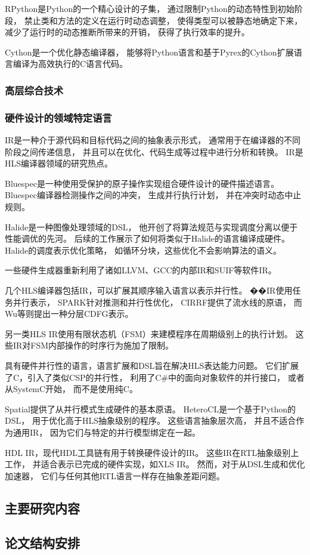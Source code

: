 RPython\cite{rpython}是Python的一个精心设计的子集，
通过限制Python的动态特性到初始阶段，
禁止类和方法的定义在运行时动态调整，
使得类型可以被静态地确定下来，
减少了运行时的动态推断所带来的开销，
获得了执行效率的提升。

Cython\cite{cython}是一个优化静态编译器，
能够将Python语言和基于Pyrex的Cython扩展语言编译为高效执行的C语言代码。


\subsubsection{高层综合技术}

\subsubsection{硬件设计的领域特定语言}

IR是一种介于源代码和目标代码之间的抽象表示形式，
通常用于在编译器的不同阶段之间传递信息，
并且可以在优化、代码生成等过程中进行分析和转换。
IR是HLS编译器领域的研究热点。

Bluespec是一种使用受保护的原子操作实现组合硬件设计的硬件描述语言。
Bluespec编译器检测操作之间的冲突，
生成并行执行计划，
并在冲突时动态中止规则。

Halide是一种图像处理领域的DSL，
他开创了将算法规范与实现调度分离以便于性能调优的先河。
后续的工作展示了如何将类似于Halide的语言编译成硬件。
Halide的调度表示优化策略，
如循环分块，这些优化不会影响算法的语义。

一些硬件生成器重新利用了诸如LLVM、GCC的内部IR和SUIF等软件IR。

几个HLS编译器包括IR，可以扩展其顺序输入语言以表示并行性。
��IR使用任务并行表示，
SPARK针对推测和并行性优化，
CIRRF提供了流水线的原语，
而Wu等则提出一种分层CDFG表示。

另一类HLS IR使用有限状态机（FSM）来建模程序在周期级别上的执行计划。
这些IR对FSM内部操作的时序行为施加了限制。

具有硬件并行性的语言，语言扩展和DSL旨在解决HLS表达能力问题。
它们扩展了C，引入了类似CSP的并行性，
利用了C\#中的面向对象软件的并行接口，
或者从SystemC开始，
而不是使用纯C。

Spatial提供了从并行模式生成硬件的基本原语。
HeteroCL是一个基于Python的DSL，
用于优化高于HLS抽象级别的程序。
这些语言抽象层次高，
并且不适合作为通用IR，
因为它们与特定的并行模型绑定在一起。

HDL IR，现代HDL工具链有用于转换硬件设计的IR。
这些IR在RTL抽象级别上工作，
并适合表示已完成的硬件实现，如XLS IR。
然而，对于从DSL生成和优化加速器，
它们与任何其他RTL语言一样存在抽象差距问题。

\subsection{主要研究内容}

\subsection{论文结构安排}